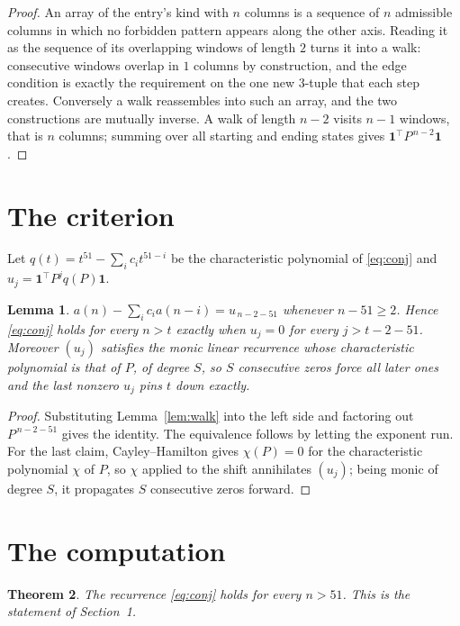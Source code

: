 \documentclass[11pt,a4paper]{article}
\theoremstyle{plain}
\newtheorem{theorem}{Theorem}
\newtheorem{lemma}[theorem]{Lemma}
\theoremstyle{definition}
\begin{document}
\begin{proof}
An array of the entry's kind with $n$ columns is a sequence of $n$ admissible columns in
which no forbidden pattern appears along the other axis. Reading it as the sequence of its
overlapping windows of length $2$ turns it into a walk: consecutive windows overlap in
$1$ columns by construction, and the edge condition is exactly the requirement on the one
new $3$-tuple that each step creates. Conversely a walk reassembles into such an array,
and the two constructions are mutually inverse. A walk of length $n-2$ visits $n-1$
windows, that is $n$ columns; summing over all starting and ending states gives
$\mathbf{1}^{\!\top}P^{\,n-2}\mathbf{1}$.
\end{proof}

\section{The criterion}

Let $q(t)=t^{51}-\sum_i c_i t^{51-i}$ be the characteristic polynomial of
\eqref{eq:conj} and $u_j=\mathbf{1}^{\!\top}P^{j}q(P)\mathbf{1}$.

\begin{lemma}\label{lem:crit}
$a(n)-\sum_i c_i a(n-i)=u_{\,n-2-51}$ whenever $n-51\ge2$. Hence
\eqref{eq:conj} holds for every $n>t$ exactly when $u_j=0$ for every
$j>t-2-51$. Moreover $(u_j)$ satisfies the monic linear recurrence whose
characteristic polynomial is that of $P$, of degree $S$, so $S$ consecutive zeros force all
later ones and the last nonzero $u_j$ pins $t$ down exactly.
\end{lemma}

\begin{proof}
Substituting Lemma~\ref{lem:walk} into the left side and factoring out
$P^{\,n-2-51}$ gives the identity. The equivalence follows by letting the exponent
run. For the last claim, Cayley--Hamilton gives $\chi(P)=0$ for the characteristic
polynomial $\chi$ of $P$, so $\chi$ applied to the shift annihilates $(u_j)$; being monic of
degree $S$, it propagates $S$ consecutive zeros forward.
\end{proof}

\section{The computation}

\begin{theorem}
The recurrence \eqref{eq:conj} holds for every $n>51$. This is the statement of
Section~1.
\end{theorem}
\end{document}
